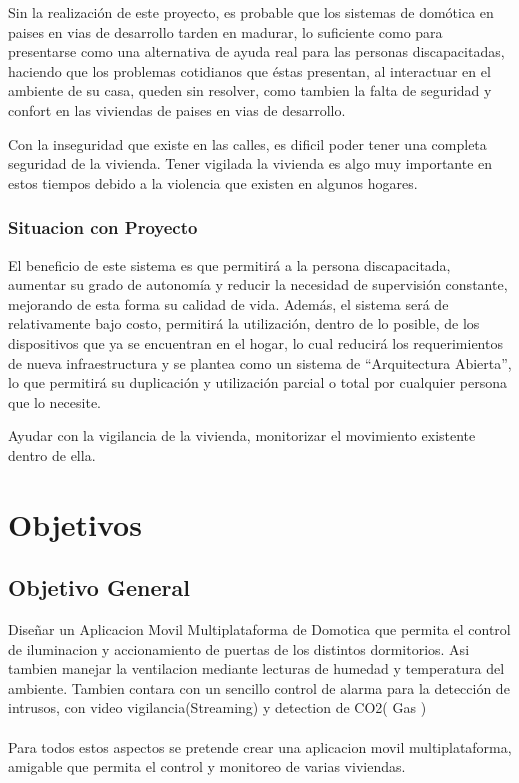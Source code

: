 \documentclass[letterpaper,12pt]{article}
\begin{document}
{		Sin la realización de este proyecto, es probable que los sistemas de domótica  en paises en vias de desarrollo tarden en madurar, lo suficiente como para presentarse como una alternativa de ayuda real para las personas discapacitadas, haciendo que los problemas cotidianos que éstas presentan, al interactuar en el ambiente de su casa, queden sin resolver, como tambien la falta de seguridad y confort en las viviendas de paises en vias de desarrollo.
		
		Con la inseguridad que existe en las calles, es dificil poder tener una completa seguridad de la vivienda.
		Tener vigilada la vivienda es algo muy importante en estos tiempos debido a la violencia que existen en algunos hogares.
		
		\subsubsection{Situacion con Proyecto}
		El beneficio de este sistema es que permitirá a la persona discapacitada, aumentar su grado de autonomía y reducir la necesidad de supervisión constante, mejorando de esta forma su calidad de vida.  Además, el sistema será de relativamente bajo costo, permitirá la utilización, dentro de lo posible, de los dispositivos que ya se encuentran en el hogar, lo cual reducirá los requerimientos de nueva infraestructura y se plantea como un sistema de “Arquitectura Abierta”, lo que permitirá su duplicación y  utilización parcial o total por cualquier persona que lo necesite. 
		
		Ayudar con la vigilancia de la vivienda, monitorizar el movimiento existente dentro de ella.
		
		
		\section{Objetivos}
		
		
		
		
		\subsection{Objetivo General}
		
		Diseñar un Aplicacion Movil Multiplataforma de Domotica que permita el control de  iluminacion y accionamiento de puertas de los distintos dormitorios.
		Asi tambien manejar la ventilacion mediante lecturas de humedad y temperatura del ambiente. Tambien contara con un sencillo control de alarma para la detección de intrusos, con video vigilancia(Streaming)  y detection de CO2( Gas )\\\\
		Para todos estos aspectos se pretende crear una aplicacion movil multiplataforma, amigable que permita el control y monitoreo de varias viviendas.
		
}
\end{document}
